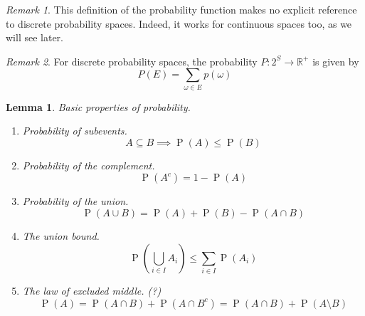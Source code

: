 \documentclass[11pt]{article}
\newtheorem{lem}{Lemma}
\theoremstyle{definition}
\theoremstyle{remark}
\newtheorem{rem}{Remark}[section]
\newcommand{\parens}[1]{\left(#1\right)}
\newcommand{\Union}{\bigcup}
\newcommand{\union}{\cup}
\newcommand{\intersn}{\cap}
\newcommand{\R}{\mathbb{R}}
\DeclareMathOperator{\Prob}{P}
\renewcommand{\P}[1]{\Prob{\parens{#1}}}
\begin{document}
\begin{rem}
    This definition of the probability function makes no explicit reference to
    discrete probability spaces. Indeed, it works for continuous spaces too, as
    we will see later.
\end{rem}

\begin{rem}
    For discrete probability spaces, the probability $P : 2^S \to \R^+$ is
    given by
    \begin{equation*}
        P(E) = \sum_{\omega \in E} p(\omega)
    \end{equation*}
\end{rem}

\begin{lem}
    Basic properties of probability.

    \begin{enumerate}
        \item Probability of subevents.
            \begin{equation*}
                A \subseteq B \implies \P{A} \leq \P{B}
            \end{equation*}

        \item Probability of the complement.
            \begin{equation*}
                \label{eq:complement-probability}
                \P{A^c} = 1 - \P{A}
            \end{equation*}

        \item Probability of the union.
            \begin{equation*}
                \P{A \union B} = \P{A} + \P{B} - \P{A \intersn B}
            \end{equation*}

        \item The union bound.
            \begin{equation}
                \label{eq:union-bound}
                \P{\Union_{i \in I} A_i} \leq \sum_{i \in I} \P{A_i}
            \end{equation}

        \item The law of excluded middle. (?)
            \begin{equation}
                \label{eq:excluded-middle}
                \P{A}
                = \P{A \intersn B} + \P{A \intersn B^c}
                = \P{A \intersn B} + \P{A \setminus B}
            \end{equation}
    \end{enumerate}
\end{lem}
\end{document}
